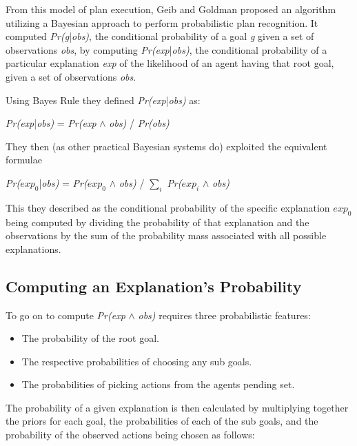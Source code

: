 \documentclass[parskip]{cs4rep}
\begin{document}
From this model of plan execution, Geib and Goldman proposed an algorithm utilizing a Bayesian approach to perform probabilistic plan recognition. It computed \textit{Pr(g}|\textit{obs)}, the conditional probability of a goal \textit{g} given a set of observations \textit{obs}, by computing \textit{Pr(exp}|\textit{obs)}, the conditional probability of a particular explanation \textit{exp} of the likelihood of an agent having that root goal, given a set of observations \textit{obs}.

Using Bayes Rule they defined \textit{Pr(exp}|\textit{obs)} as:\newline

\centerline{
\textit{Pr(exp}|\textit{obs)} = \textit{Pr(exp} $\wedge$ \textit{obs)} / \textit{Pr(obs)}
}

They then (as other practical Bayesian systems do) exploited the equivalent formulae\newline

\centerline{
\textit{Pr($exp_0$}|\textit{obs)} = \textit{Pr($exp_0$} $\wedge$ \textit{obs)} / $\displaystyle\sum\nolimits_{i}$ \textit{Pr($exp_i$} $\wedge$ \textit{obs)}
}

This they described as the conditional probability of the specific explanation $exp_0$ being computed by dividing the probability of that explanation and the observations by the sum of the probability mass associated with all possible explanations.

\subsection{Computing an Explanation's Probability}

To go on to compute \textit{Pr(exp} $\wedge$ \textit{obs)} requires three probabilistic features:\newline

\begin{itemize}
\item
The probability of the root goal.
\item
The respective probabilities of choosing any sub goals.
\item
The probabilities of picking actions from the agents pending set.\newline
\end{itemize}

The probability of a given explanation is then calculated by multiplying together the priors for each goal, the probabilities of each of the sub goals, and the probability of the observed actions being chosen as follows:\newline
\end{document}
